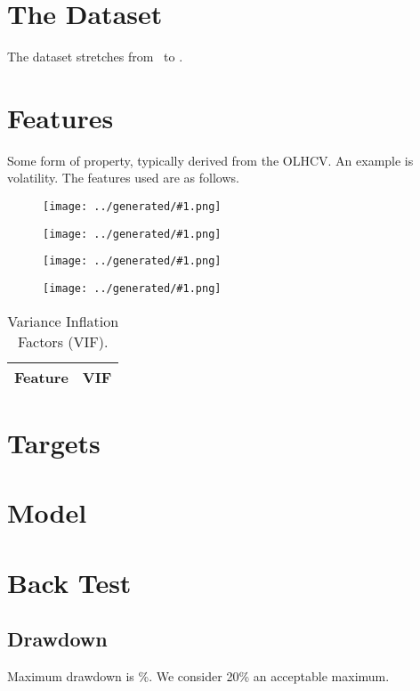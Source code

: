 \documentclass[a4paper]{article}
\newcommand{\figureTau}[1]{
    \begin{figure}[H]
        \begin{center}
            \texttt{[image: ../generated/\#1.png]}
        \end{center}
    \end{figure}
}
\begin{document}
\section{The Dataset}

The dataset stretches from \constantStartdate \  to \constantEnddate.

\section{Features}

Some form of property, typically derived from the OLHCV. An example is
volatility. The features used are as follows.

\figureTau{feature_BollingerBands}

\figureTau{feature_RSI}

\figureTau{pearsonmatrix}

\figureTau{spearmanmatrix}

\begin{table}[H]
\begin{center}
\caption{Variance Inflation Factors (VIF).}
    \begin{tabular}{ |l|l| }
        \hline
        Feature & VIF \\
        \hline

        

    \end{tabular}
\end{center}
\end{table}

\section{Targets}

\section{Model}



\section{Back Test}
\subsection{Drawdown}

Maximum drawdown is \constantMaxdrawdown \%. We consider 20\% an acceptable maximum.
\end{document}
